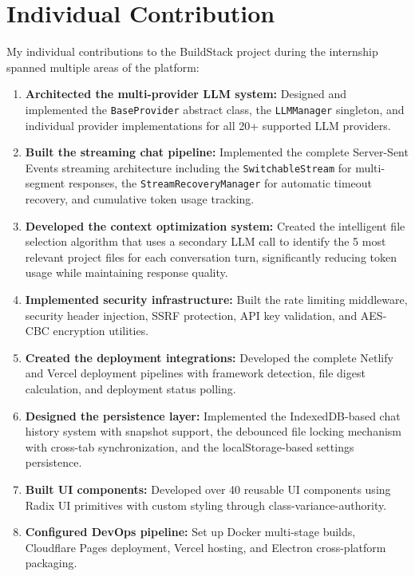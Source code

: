 \documentclass[12pt,a4paper,openany]{report}
\begin{document}
\section{Individual Contribution}

My individual contributions to the BuildStack project during the internship spanned multiple areas of the platform:

\begin{enumerate}
    \item \textbf{Architected the multi-provider LLM system:} Designed and implemented the \texttt{BaseProvider} abstract class, the \texttt{LLMManager} singleton, and individual provider implementations for all 20+ supported LLM providers.

    \item \textbf{Built the streaming chat pipeline:} Implemented the complete Server-Sent Events streaming architecture including the \texttt{SwitchableStream} for multi-segment responses, the \texttt{StreamRecoveryManager} for automatic timeout recovery, and cumulative token usage tracking.

    \item \textbf{Developed the context optimization system:} Created the intelligent file selection algorithm that uses a secondary LLM call to identify the 5 most relevant project files for each conversation turn, significantly reducing token usage while maintaining response quality.

    \item \textbf{Implemented security infrastructure:} Built the rate limiting middleware, security header injection, SSRF protection, API key validation, and AES-CBC encryption utilities.

    \item \textbf{Created the deployment integrations:} Developed the complete Netlify and Vercel deployment pipelines with framework detection, file digest calculation, and deployment status polling.

    \item \textbf{Designed the persistence layer:} Implemented the IndexedDB-based chat history system with snapshot support, the debounced file locking mechanism with cross-tab synchronization, and the localStorage-based settings persistence.

    \item \textbf{Built UI components:} Developed over 40 reusable UI components using Radix UI primitives with custom styling through class-variance-authority.

    \item \textbf{Configured DevOps pipeline:} Set up Docker multi-stage builds, Cloudflare Pages deployment, Vercel hosting, and Electron cross-platform packaging.
\end{enumerate}
\end{document}
